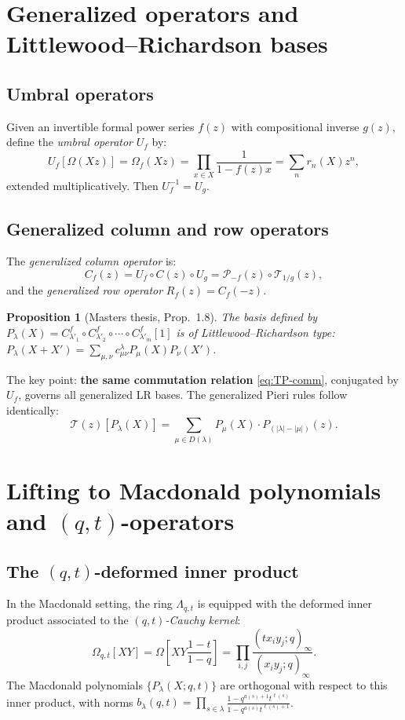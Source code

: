 \documentclass[11pt]{article}
\theoremstyle{plain}
\newtheorem{proposition}[theorem]{Proposition}
\theoremstyle{definition}
\begin{document}
\section{Generalized operators and Littlewood--Richardson bases}

\subsection{Umbral operators}
Given an invertible formal power series $f(z)$ with compositional inverse $g(z)$, define the \emph{umbral operator} $U_f$ by:
\[
U_f[\Omega(Xz)] = \Omega_f(Xz) = \prod_{x \in X} \frac{1}{1 - f(z)x} = \sum_n r_n(X) z^n,
\]
extended multiplicatively.  Then $U_f^{-1} = U_g$.

\subsection{Generalized column and row operators}
The \emph{generalized column operator} is:
\[
C_f(z) = U_f \circ C(z) \circ U_g = \mathcal{P}_{-f}(z) \circ \mathcal{T}_{1/g}(z),
\]
and the \emph{generalized row operator} $R_f(z) = C_f(-z)$.

\begin{proposition}[Masters thesis, Prop.~1.8]
The basis defined by $P_\lambda(X) = C^f_{\lambda'_1} \circ C^f_{\lambda'_2} \circ \cdots \circ C^f_{\lambda'_m}[1]$
is of Littlewood--Richardson type:
$P_\lambda(X+X') = \sum_{\mu,\nu} c^\lambda_{\mu\nu} P_\mu(X) P_\nu(X')$.
\end{proposition}

The key point: \textbf{the same commutation relation} \eqref{eq:TP-comm}, conjugated by $U_f$, governs all generalized LR bases.  The generalized Pieri rules follow identically:
\[
\mathcal{T}(z)[P_\lambda(X)] = \sum_{\mu \in D(\lambda)} P_\mu(X) \cdot P_{(|\lambda|-|\mu|)}(z).
\]

\section{Lifting to Macdonald polynomials and $(q,t)$-operators}

\subsection{The $(q,t)$-deformed inner product}
In the Macdonald setting, the ring $\Lambda_{q,t}$ is equipped with the deformed inner product associated to the \emph{$(q,t)$-Cauchy kernel}:
\begin{equation}\label{eq:qt-cauchy}
\Omega_{q,t}[XY] = \Omega\!\left[XY\frac{1-t}{1-q}\right] = \prod_{i,j} \frac{(tx_i y_j; q)_\infty}{(x_i y_j; q)_\infty}.
\end{equation}
The Macdonald polynomials $\{P_\lambda(X;q,t)\}$ are orthogonal with respect to this inner product, with norms $b_\lambda(q,t) = \prod_{s \in \lambda} \frac{1 - q^{a(s)+1}t^{\ell(s)}}{1 - q^{a(s)}t^{\ell(s)+1}}$.
\end{document}
